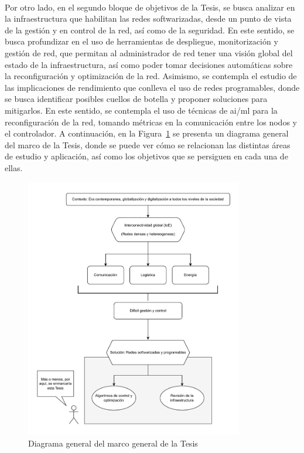 \\
Por otro lado, en el segundo bloque de objetivos de la Tesis, se busca analizar en la infraestructura que habilitan las redes softwarizadas, desde un punto de vista de la gestión y en control de la red, así como de la seguridad. En este sentido, se busca profundizar en el uso de herramientas de despliegue, monitorización y gestión de red, que permitan al administrador de red tener una visión global del estado de la infraestructura, así como poder tomar decisiones automáticas sobre la reconfiguración y optimización de la red. Asimismo, se contempla el estudio de las implicaciones de rendimiento que conlleva el uso de redes programables, donde se busca identificar posibles cuellos de botella y proponer soluciones para mitigarlos. En este sentido, se contempla el uso de técnicas de \gls{ai}/\gls{ml} para la reconfiguración de la red, tomando métricas en la comunicación entre los nodos y el controlador. A continuación, en la Figura~\ref{fig:intro_1} se presenta un diagrama general del marco de la Tesis, donde se puede ver cómo se relacionan las distintas áreas de estudio y aplicación, así como los objetivos que se persiguen en cada una de ellas.

\begin{figure}[ht!]
    \centering
    \includegraphics[width=0.85\textwidth]{fig/01_intro/intro_1.drawio.pdf}
    \caption{Diagrama general del marco general de la Tesis}
    \label{fig:intro_1}
\end{figure}

